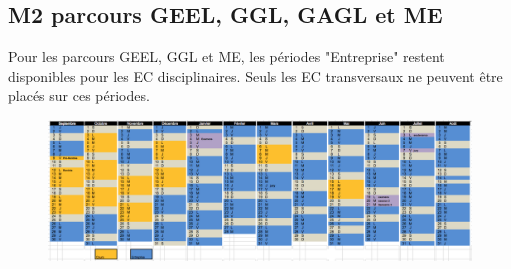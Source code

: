 \documentclass[a4paper,11pt]{article}
\begin{document}

\subsection{M2 parcours GEEL, GGL, GAGL et ME}
Pour les parcours GEEL, GGL et ME, les périodes "Entreprise" restent disponibles pour les EC disciplinaires. Seuls les EC transversaux ne peuvent être placés sur ces périodes.
\begin{figure}[H]
	\centering
		\includegraphics[width=1.4\textwidth, angle=90]{Calendriers/calendrierM2GAGL.png}
	\label{calM2GAGL}
\end{figure}

\end{document}
